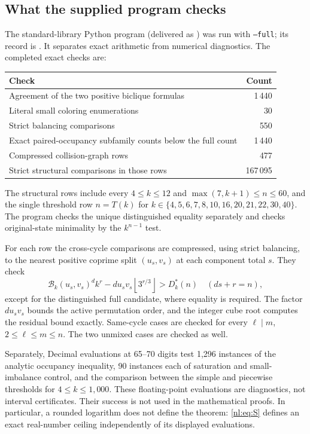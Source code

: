 \documentclass[11pt,a4paper]{article}
\numberwithin{equation}{section}
\theoremstyle{definition}
\theoremstyle{remark}
\newcommand{\Bip}{\mathcal B}
\newcommand{\nlfloor}[1]{\left\lfloor #1\right\rfloor}
\begin{document}
\subsection{What the supplied program checks}
The standard-library Python program 
(delivered as ) was run with \texttt{--full}; its
record is . It separates exact arithmetic from numerical diagnostics.
The completed exact checks are:
\begin{center}
\begin{tabular}{@{}p{}r@{}}
\toprule
Check & Count\\\midrule
Agreement of the two positive biclique formulas & 1\,440\\
Literal small coloring enumerations & 30\\
Strict balancing comparisons & 550\\
Exact paired-occupancy subfamily counts below the full count & 1\,440\\
Compressed collision-graph rows & 477\\
Strict structural comparisons in those rows & 167\,095\\
\bottomrule
\end{tabular}
\end{center}
The structural rows include every $4\le k\le12$ and
$\max(7,k+1)\le n\le60$, and the single threshold row $n=T(k)$ for
$k\in\{4,5,6,7,8,10,16,20,21,22,30,40\}$.
The program checks the unique distinguished equality separately and checks
original-state minimality by the $k^{n-1}$ test.

For each row the cross-cycle comparisons are compressed, using strict
balancing, to the nearest positive coprime split $(u_s,v_s)$ at each
component total $s$. They check
\[
 \Bip_k(u_s,v_s)^d k^r-du_sv_s\nlfloor{3^{r/3}}>D^*_k(n)
 \quad(ds+r=n),
\]
except for the distinguished full candidate, where equality is required.
The factor $du_sv_s$ bounds the active permutation order, and the integer
cube root computes the residual bound exactly. Same-cycle cases are
checked for every $\ell\mid m$, $2\le\ell\le m\le n$.
The two unmixed cases are checked as well.

Separately, Decimal evaluations at 65--70 digits test 1,296 instances of
the analytic occupancy inequality, 90 instances each of saturation and
small-imbalance control, and the comparison between the simple and
piecewise thresholds for $4\le k\le1,000$.
These floating-point evaluations are diagnostics, not interval certificates.
Their success is not used in the mathematical proofs. In particular, a
rounded logarithm does not define the theorem: \eqref{nl:eq:S} defines an
exact real-number ceiling independently of its displayed evaluations.
\end{document}

